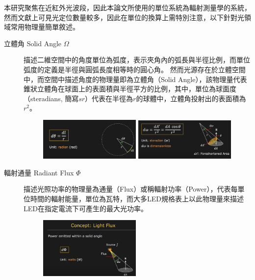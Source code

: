         本研究聚焦在近紅外光波段，因此本論文所使用的單位系統為輻射測量學的系統，然而文獻上可見光定位數量較多，因此在單位的換算上需特別注意，以下針對光領域常用物理量簡單敘述。

        
        \begin{description}
            \item[立體角 Solid Angle $\Omega$] \hfill
                
                描述二維空間中的角度單位為弧度，表示夾角內的弧長與半徑比例，而單位弧度的定義是半徑與圓弧長度相等時的圓心角。
                然而光源存在於立體空間中，而空間中描述角度的物理量即為立體角（Solid Angle），該物理量代表錐狀立體角在球面上的表面積與半徑平方的比例，其中，單位為球面度（steradians, 簡寫$sr$）代表在半徑為$r$的球體中，立體角投射出的表面積為$r^2$。

                \begin{figure}[ht]
                    \centering
                    \includegraphics[width=5cm]{00temppic/1.png}
                    \includegraphics[width=5cm]{00temppic/2.png}
                \end{figure}

            \item[輻射通量 Radiant Flux $\Phi$]  \hfill
                
                描述光照功率的物理量為通量（Flux）或稱輻射功率（Power），代表每單位時間的輻射能量，單位為瓦特，而大多LED規格表上以此物理量來描述LED在指定電流下可產生的最大光功率。

                \begin{figure}[ht]
                    \centering
                    \includegraphics[width=5cm]{00temppic/3.png}
                \end{figure}


\end{description}
